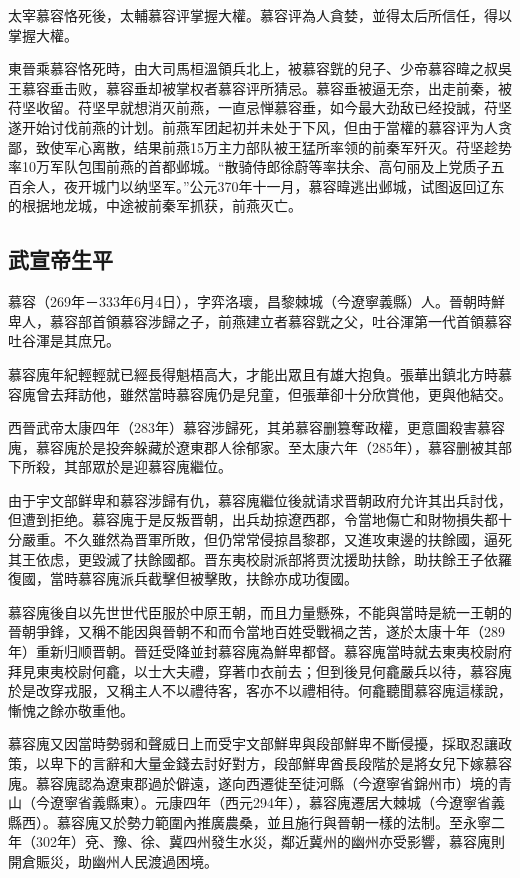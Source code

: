 太宰慕容恪死後，太輔慕容评掌握大權。慕容评為人貪婪，並得太后所信任，得以掌握大權。

東晉乘慕容恪死時，由大司馬桓溫領兵北上，被慕容皝的兒子、少帝慕容暐之叔吳王慕容垂击败，慕容垂却被掌权者慕容评所猜忌。慕容垂被逼无奈，出走前秦，被苻坚收留。苻坚早就想消灭前燕，一直忌惮慕容垂，如今最大劲敌已经投誠，苻坚遂开始讨伐前燕的计划。前燕军团起初并未处于下风，但由于當權的慕容评为人贪鄙，致使军心离散，结果前燕15万主力部队被王猛所率领的前秦军歼灭。苻坚趁势率10万军队包围前燕的首都邺城。“散骑侍郎徐蔚等率扶余、高句丽及上党质子五百余人，夜开城门以纳坚军。”公元370年十一月，慕容暐逃出邺城，试图返回辽东的根据地龙城，中途被前秦军抓获，前燕灭亡。

\subsection{武宣帝生平}

慕容（269年－333年6月4日），字弈洛瓌，昌黎棘城（今遼寧義縣）人。晉朝時鮮卑人，慕容部首領慕容涉歸之子，前燕建立者慕容皝之父，吐谷渾第一代首領慕容吐谷渾是其庶兄。

慕容廆年紀輕輕就已經長得魁梧高大，才能出眾且有雄大抱負。張華出鎮北方時慕容廆曾去拜訪他，雖然當時慕容廆仍是兒童，但張華卻十分欣賞他，更與他結交。

西晉武帝太康四年（283年）慕容涉歸死，其弟慕容删篡奪政權，更意圖殺害慕容廆，慕容廆於是投奔躲藏於遼東郡人徐郁家。至太康六年（285年），慕容删被其部下所殺，其部眾於是迎慕容廆繼位。

由于宇文部鲜卑和慕容涉歸有仇，慕容廆繼位後就请求晋朝政府允许其出兵討伐，但遭到拒绝。慕容廆于是反叛晋朝，出兵劫掠遼西郡，令當地傷亡和財物損失都十分嚴重。不久雖然為晋軍所敗，但仍常常侵掠昌黎郡，又進攻東邊的扶餘國，逼死其王依虑，更毀滅了扶餘國都。晋东夷校尉派部將贾沈援助扶餘，助扶餘王子依羅復國，當時慕容廆派兵截擊但被擊敗，扶餘亦成功復國。

慕容廆後自以先世世代臣服於中原王朝，而且力量懸殊，不能與當時是統一王朝的晉朝爭鋒，又稱不能因與晉朝不和而令當地百姓受戰禍之苦，遂於太康十年（289年）重新归顺晋朝。晉廷受降並封慕容廆為鮮卑都督。慕容廆當時就去東夷校尉府拜見東夷校尉何龕，以士大夫禮，穿著巾衣前去；但到後見何龕嚴兵以待，慕容廆於是改穿戎服，又稱主人不以禮待客，客亦不以禮相待。何龕聽聞慕容廆這樣說，慚愧之餘亦敬重他。

慕容廆又因當時勢弱和聲威日上而受宇文部鮮卑與段部鮮卑不斷侵擾，採取忍讓政策，以卑下的言辭和大量金錢去討好對方，段部鮮卑酋長段階於是將女兒下嫁慕容廆。慕容廆認為遼東郡過於僻遠，遂向西遷徙至徒河縣（今遼寧省錦州市）境的青山（今遼寧省義縣東）。元康四年（西元294年），慕容廆遷居大棘城（今遼寧省義縣西）。慕容廆又於勢力範圍內推廣農桑，並且施行與晉朝一樣的法制。至永寧二年（302年）兗、豫、徐、冀四州發生水災，鄰近冀州的幽州亦受影響，慕容廆則開倉賑災，助幽州人民渡過困境。

